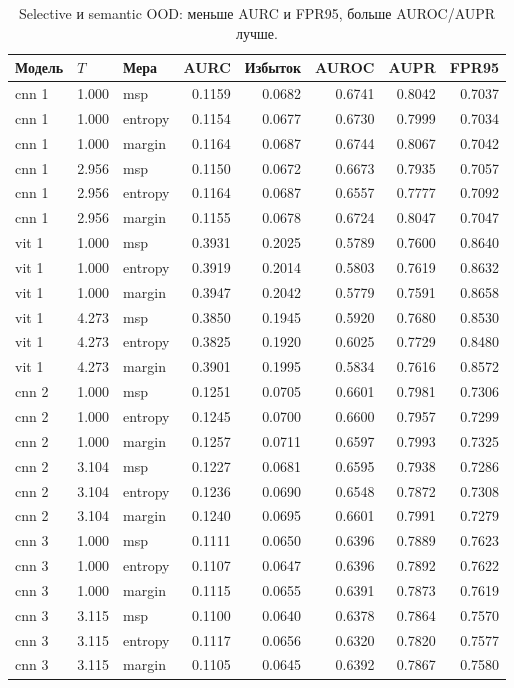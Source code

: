 \begin{table}[H]\centering\scriptsize
\setlength{\tabcolsep}{4pt}
\caption{Selective и semantic OOD: меньше AURC и FPR95, больше AUROC/AUPR лучше.}\label{tab:ood}
\begin{tabular}{ll lrrrrr}
\toprule
Модель & $T$ & Мера & AURC & Избыток & AUROC & AUPR & FPR95 \\
\midrule
cnn 1 & 1.000 & msp & 0.1159 & 0.0682 & 0.6741 & 0.8042 & 0.7037 \\
cnn 1 & 1.000 & entropy & 0.1154 & 0.0677 & 0.6730 & 0.7999 & 0.7034 \\
cnn 1 & 1.000 & margin & 0.1164 & 0.0687 & 0.6744 & 0.8067 & 0.7042 \\
cnn 1 & 2.956 & msp & 0.1150 & 0.0672 & 0.6673 & 0.7935 & 0.7057 \\
cnn 1 & 2.956 & entropy & 0.1164 & 0.0687 & 0.6557 & 0.7777 & 0.7092 \\
cnn 1 & 2.956 & margin & 0.1155 & 0.0678 & 0.6724 & 0.8047 & 0.7047 \\
vit 1 & 1.000 & msp & 0.3931 & 0.2025 & 0.5789 & 0.7600 & 0.8640 \\
vit 1 & 1.000 & entropy & 0.3919 & 0.2014 & 0.5803 & 0.7619 & 0.8632 \\
vit 1 & 1.000 & margin & 0.3947 & 0.2042 & 0.5779 & 0.7591 & 0.8658 \\
vit 1 & 4.273 & msp & 0.3850 & 0.1945 & 0.5920 & 0.7680 & 0.8530 \\
vit 1 & 4.273 & entropy & 0.3825 & 0.1920 & 0.6025 & 0.7729 & 0.8480 \\
vit 1 & 4.273 & margin & 0.3901 & 0.1995 & 0.5834 & 0.7616 & 0.8572 \\
cnn 2 & 1.000 & msp & 0.1251 & 0.0705 & 0.6601 & 0.7981 & 0.7306 \\
cnn 2 & 1.000 & entropy & 0.1245 & 0.0700 & 0.6600 & 0.7957 & 0.7299 \\
cnn 2 & 1.000 & margin & 0.1257 & 0.0711 & 0.6597 & 0.7993 & 0.7325 \\
cnn 2 & 3.104 & msp & 0.1227 & 0.0681 & 0.6595 & 0.7938 & 0.7286 \\
cnn 2 & 3.104 & entropy & 0.1236 & 0.0690 & 0.6548 & 0.7872 & 0.7308 \\
cnn 2 & 3.104 & margin & 0.1240 & 0.0695 & 0.6601 & 0.7991 & 0.7279 \\
cnn 3 & 1.000 & msp & 0.1111 & 0.0650 & 0.6396 & 0.7889 & 0.7623 \\
cnn 3 & 1.000 & entropy & 0.1107 & 0.0647 & 0.6396 & 0.7892 & 0.7622 \\
cnn 3 & 1.000 & margin & 0.1115 & 0.0655 & 0.6391 & 0.7873 & 0.7619 \\
cnn 3 & 3.115 & msp & 0.1100 & 0.0640 & 0.6378 & 0.7864 & 0.7570 \\
cnn 3 & 3.115 & entropy & 0.1117 & 0.0656 & 0.6320 & 0.7820 & 0.7577 \\
cnn 3 & 3.115 & margin & 0.1105 & 0.0645 & 0.6392 & 0.7867 & 0.7580 \\
\bottomrule
\end{tabular}
\end{table}
